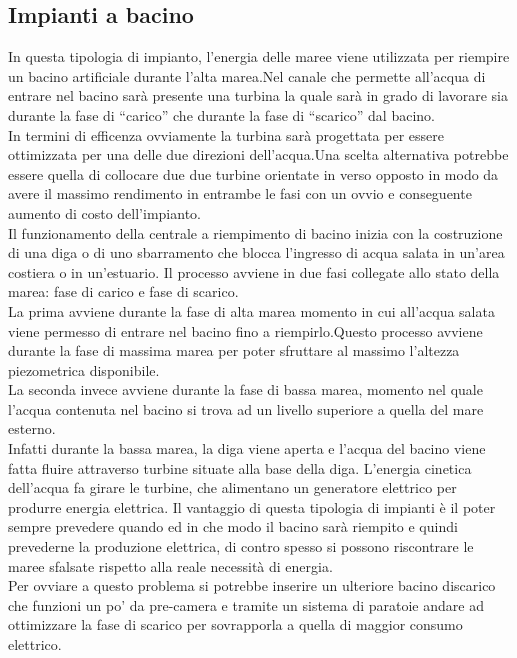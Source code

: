\subsection{Impianti a bacino}
In questa tipologia di impianto, l'energia delle maree viene utilizzata per riempire un bacino artificiale durante l'alta marea.Nel canale che permette all'acqua di entrare nel bacino sarà presente una turbina la quale sarà in grado di lavorare sia durante la fase di \enquote{carico} che durante la fase di \enquote{scarico} dal bacino.\\
In termini di efficenza ovviamente la turbina sarà progettata per essere ottimizzata per una delle due direzioni dell'acqua.Una scelta alternativa potrebbe essere quella di collocare due due turbine orientate in verso opposto in modo da avere il massimo rendimento in entrambe le fasi con un ovvio e conseguente aumento di costo dell'impianto.\\
Il funzionamento della centrale a riempimento di bacino inizia con la costruzione di una diga o di uno sbarramento che blocca l'ingresso di acqua salata in un'area costiera o in un'estuario.
Il processo avviene in due fasi collegate allo stato della marea: fase di carico e fase di scarico.\\
La prima avviene durante la fase di alta marea momento in cui all'acqua salata viene permesso di entrare nel bacino fino a riempirlo.Questo processo avviene durante la fase di massima marea per poter sfruttare al massimo l'altezza piezometrica disponibile.\\
La seconda invece avviene durante la fase di bassa marea, momento nel quale l'acqua contenuta nel bacino si trova ad un livello superiore a quella del mare esterno.\\
Infatti durante la bassa marea, la diga viene aperta e l'acqua del bacino viene fatta fluire attraverso turbine situate alla base della diga.
L'energia cinetica dell'acqua fa girare le turbine, che alimentano un generatore elettrico per produrre energia elettrica.
Il vantaggio di questa tipologia di impianti è il poter sempre prevedere quando ed in che modo il bacino sarà riempito e quindi prevederne la produzione elettrica, di contro spesso si possono riscontrare le maree sfalsate rispetto alla reale necessità di energia.\\
Per ovviare a questo problema si potrebbe inserire un ulteriore bacino discarico che funzioni un po' da pre-camera e tramite un sistema di paratoie andare ad ottimizzare la fase di scarico per sovrapporla a quella di maggior consumo elettrico.\\

